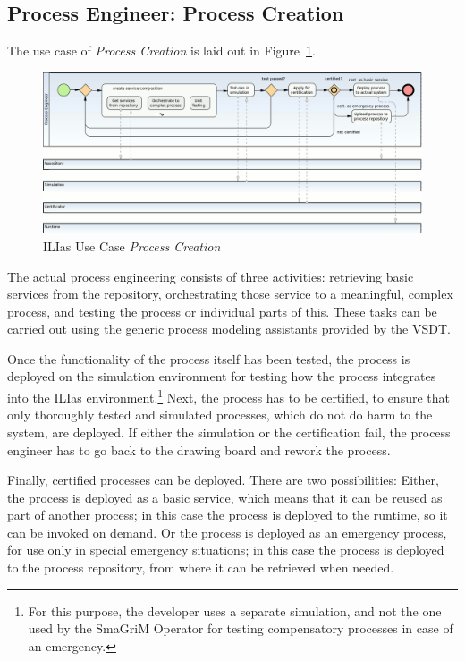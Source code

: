 \subsection{Process Engineer: Process Creation}

The use case of \emph{Process Creation} is laid out in Figure~\ref{fig:ilias-proc-creation}.

\begin{figure}[ht]
	\includegraphics[width=\textwidth]{ilias/bpmn_ilias-2.png}
	\caption{ILIas Use Case \emph{Process Creation}}
	\label{fig:ilias-proc-creation}
\end{figure}

The actual process engineering consists of three activities: retrieving basic
services from the repository, orchestrating those service to a meaningful, complex
process, and testing the process or individual parts of this.  These tasks can be
carried out using the generic process modeling assistants provided by the VSDT.

Once the functionality of the process itself has been tested, the process is
deployed on the simulation environment for testing how the process integrates
into the ILIas environment.\footnote{For this purpose, the developer uses a
separate simulation, and not the one used by the SmaGriM Operator for testing
compensatory processes in case of an emergency.} Next, the process has to be
certified, to ensure that only thoroughly tested and simulated processes, which
do not do harm to the system, are deployed.  If either the simulation or the
certification fail, the process engineer has to go back to the drawing board
and rework the process.

Finally, certified processes can be deployed.  There are two possibilities:
Either, the process is deployed as a basic service, which means that it can be
reused as part of another process; in this case the process is deployed to the
runtime, so it can be invoked on demand.  Or the process is deployed as an
emergency process, for use only in special emergency situations; in this case the
process is deployed to the process repository, from where it can be retrieved
when needed.


